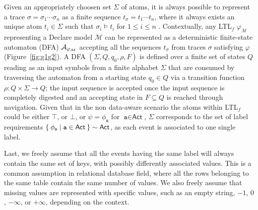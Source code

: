 Given an appropriately choosen set $\Sigma$ of atoms, it is always possible to represent a trace $\sigma=\sigma_1\cdots \sigma_n$ as a finite sequence $t_\sigma=t_1\cdots t_n$, where it always exists an unique atom $t_i\in\Sigma$ such that $\sigma_i\vDash t_i$ for $1\leq i\leq n$ \cite{XuLZ17a,MaggiMCA18}. 
Contextually,  any LTL$_f$ $\varphi_{\mathcal{M}}$ representing a Declare model $\mathcal{M}$ can be represented as a deterministic finite-state automaton (DFA) $\mathcal{A}_{\varphi_{\tiny\mathcal{M}}}$ \cite{Westergaard11,Lydia} accepting all the sequences $t_\sigma$ from traces $\sigma$ satisfying $\varphi$ (Figure~\ref{fig:g1g2}). A DFA  $(\Sigma,Q,q_0,\rho,F)$ is defined \cite{0016921} over a finite set of states $Q$ reading as an input symbols from a finite alphabet $\Sigma$ that are consumed by traversing the automaton from a starting state $q_0\in Q$ via a transition function $\rho\colon Q\times \Sigma\to Q$; the input sequence is accepted once the input sequence is completely digested and an accepting state in $F\subseteq Q$ is reached through navigation. Given that in the non data-aware scenario the atoms within LTL$_f$ could be either $\top$, or $\bot$, or $\psi=\phi_\texttt{a}$ for $\texttt{a}\in\textsf{Act}$, $\Sigma$ corresponds to the set of label requirements $\Set{\phi_\texttt{a}|\texttt{a}\in\textsf{Act}}\sim\textsf{Act}$, as each event is associated to one single label.

Last, we freely assume that all the events having the same label will always contain the same set of keys, with possibly differently associated values. This is a common assumption in relational database field, where all the rows belonging to the same table contain the same number of values. We also freely assume that missing values are represented with specific values, such as an empty string, $-1$, $0$, $-\infty$, or $+\infty$, depending on the context.